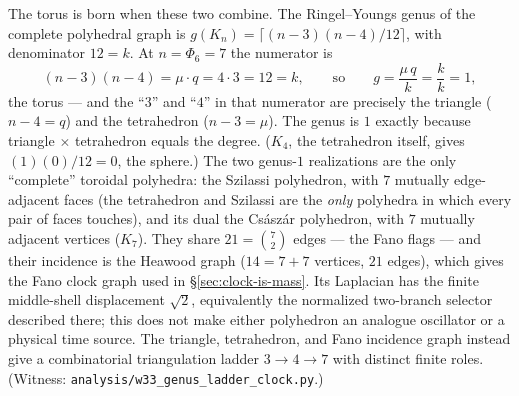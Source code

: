 \documentclass[11pt]{article}
\begin{document}
The torus is born when these two combine. The Ringel--Youngs genus of the complete
polyhedral graph is $g(K_n)=\lceil (n-3)(n-4)/12\rceil$, with denominator $12=k$.
At $n=\Phi_6=7$ the numerator is
\[
  (n-3)(n-4)=\mu\cdot q = 4\cdot 3 = 12 = k,\qquad\text{so}\qquad
  g=\frac{\mu\,q}{k}=\frac{k}{k}=1,
\]
the torus --- and the ``$3$'' and ``$4$'' in that numerator are precisely the
triangle ($n-4=q$) and the tetrahedron ($n-3=\mu$). The genus is $1$ exactly
because triangle $\times$ tetrahedron equals the degree. ($K_4$, the tetrahedron
itself, gives $(1)(0)/12=0$, the sphere.) The two genus-$1$ realizations are the
only ``complete'' toroidal polyhedra: the Szilassi polyhedron, with $7$ mutually
edge-adjacent faces (the tetrahedron and Szilassi are the \emph{only} polyhedra in
which every pair of faces touches), and its dual the Cs\'asz\'ar polyhedron, with
$7$ mutually adjacent vertices ($K_7$). They share $21=\binom72$ edges --- the Fano
flags --- and their incidence is the Heawood graph ($14=7+7$ vertices, $21$ edges),
which gives the Fano clock graph used in \S\ref{sec:clock-is-mass}.  Its
Laplacian has the finite middle-shell displacement $\sqrt2$, equivalently the
normalized two-branch selector described there; this does not make either
polyhedron an analogue oscillator or a physical time source.  The triangle,
tetrahedron, and Fano incidence graph instead give a combinatorial
triangulation ladder $3\to4\to7$ with distinct finite roles. (Witness:
\texttt{analysis/w33\_genus\_ladder\_clock.py}.)
\end{document}
